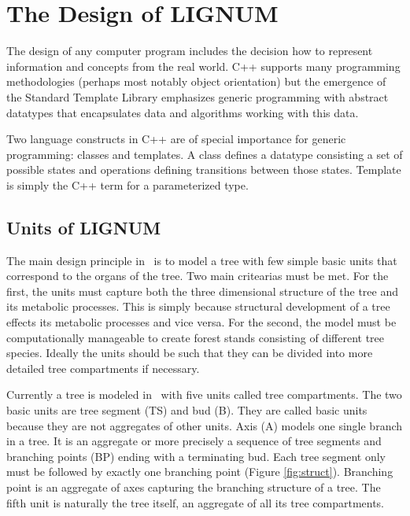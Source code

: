 \chapter{The Design of LIGNUM}

The  design of  any  computer  program includes  the  decision how  to
represent information  and concepts from the real  world. C++ supports
many   programming   methodologies   (perhaps  most   notably   object
orientation)  but  the  emergence  of the  Standard  Template  Library
emphasizes   generic   programming   with  abstract   datatypes   that
encapsulates data and algorithms  working with this data. 

Two language  constructs in C++ are  of special importance for generic
programming: classes  and   templates.   A class  defines   a datatype
consisting   a  set of   possible   states  and  operations   defining
transitions between those states. Template  is simply the C++ term for
a parameterized type.

\section{Units of LIGNUM} 

The main design principle  in  \lignum\ is to  model  a tree with  few
simple basic units that correspond to the organs of the tree. Two main
critearias must  be met.  For the first,  the  units must capture both
the  three  dimensional   structure of  the   tree   and its metabolic
processes.   This is simply because  structural  development of a tree
effects  its metabolic processes and  vice versa.  For the second, the
model must  be  computationally  manageable  to create   forest stands
consisting of  different  tree species.   Ideally  the units should be
such that they can be divided  into more detailed tree compartments if
necessary.

Currently a  tree is modeled in  \lignum\ with five  units called tree
compartments.  The two basic units  are tree segment (TS) and bud (B).
They are called  basic units because they are  not aggregates of other
units.   Axis (A)  models  one single  branch  in a  tree.   It is  an
aggregate or more precisely a  sequence of tree segments and branching
points (BP)  ending with  a terminating bud.   Each tree  segment only
must   be   followed   by   exactly  one   branching   point   (Figure
\ref{fig:struct}).  Branching point is  an aggregate of axes capturing
the branching  structure of a tree.   The fifth unit  is naturally the
tree itself, an aggregate of all its tree compartments.

